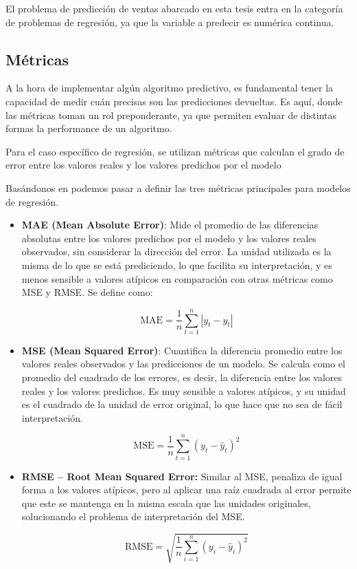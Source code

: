 El problema de predicción de ventas abarcado en esta tesis entra en la categoría de problemas de regresión, ya que la variable a predecir es numérica continua.

\subsection{Métricas}

A la hora de implementar algún algoritmo predictivo, es fundamental tener la capacidad de medir cuán precisas son las predicciones devueltas. Es aquí, donde las métricas toman un rol preponderante, ya que permiten evaluar de distintas formas la performance de un algoritmo.

Para el caso específico de regresión, se utilizan métricas que calculan el grado de error entre los valores reales y los valores predichos por el modelo

Basándonos en \parencite{hyndman2018forecasting, james2013isl} podemos pasar a definir las tres métricas principales para modelos de regresión.

\begin{itemize}
    \item \textbf{MAE (Mean Absolute Error)}: Mide el promedio de las diferencias absolutas entre los valores predichos por el modelo y los valores reales observados, sin considerar la dirección del error. La unidad utilizada es la misma de lo que se está prediciendo, lo que facilita su interpretación, y es menos sensible a valores atípicos en comparación con otras métricas como MSE y RMSE. Se define como:

    \[
        \mbox{MAE} = \frac{1}{n} \sum_{t=1}^{n} \left| y_t - \hat{y}_t \right|
    \]

    \item \textbf{MSE (Mean Squared Error)}: Cuantifica la diferencia promedio entre los valores reales observados y las predicciones de un modelo. Se calcula como el promedio del cuadrado de los errores, es decir, la diferencia entre los valores reales y los valores predichos. Es muy sensible a valores atípicos, y su unidad es el cuadrado de la unidad de error original, lo que hace que no sea de fácil interpretación.
    
    \[
        \mbox{MSE} = \frac{1}{n} \sum_{t=1}^{n} \left( y_t - \hat{y}_t \right)^2 
    \]

    \item \textbf{RMSE – Root Mean Squared Error:} Similar al MSE, penaliza de igual forma a los valores atípicos, pero al aplicar una raíz cuadrada al error permite que este se mantenga en la misma escala que las unidades originales, solucionando el problema de interpretación del MSE.

    \[
        \mbox{RMSE} = \sqrt{ \frac{1}{n} \sum_{i=1}^{n} (y_i - \hat{y}_i)^2 }
    \]
\end{itemize}

